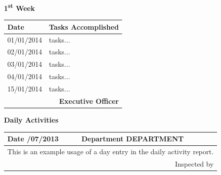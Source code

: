 \documentclass[pdftex,12pt,a4paper]{extreport}
\begin{document}
\newenvironment{dailyactivity}[2]
{
    \newpage
    \begin{center}
    \textbf{Daily Activities}\\[1cm]
    \begin{tabular}{|p{2.5cm}|p{12.5cm}|}
        \hline
        \textbf{Date} \newline #1 & \textbf{Department} \newline DEPARTMENT\\
        \hline
        \multicolumn{2}{|p{15.5cm}|}{#2}\\[19cm]
}
{
        \hline
        \multicolumn{2}{|r|}{Inspected by}\\[2cm]
        \hline
    \end{tabular}
    \end{center}
}

%
\newpage
\textbf{1\textsuperscript{st} Week}
\begin{center}
\begin{tabular}{|p{2.5cm}|p{12.5cm}|}
\hline
\textbf{Date} & \textbf{Tasks Accomplished}\\
\hline
01/01/2014 & tasks...\\[1cm]
\hline
02/01/2014 & tasks...\\[1cm]
\hline
03/01/2014 & tasks...\\[1cm]
\hline
04/01/2014 & tasks...\\[1cm]
\hline
15/01/2014 & tasks...\\[1cm]
\hline
\multicolumn{2}{|r|}{\textbf{Executive Officer}}\\[1cm]
\hline
\end{tabular}
\end{center}

\begin{dailyactivity}{10/07/2013}
{
This is an example usage of a day entry in the daily activity report.
}
\end{dailyactivity}
\end{document}
